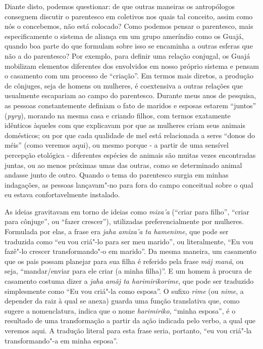 Diante disto, podemos questionar: de que outras maneiras os antropólogos
conseguem discutir o parentesco em coletivos nos quais tal conceito,
assim como nós o concebemos, não está colocado? Como podemos pensar o
parentesco, mais especificamente o sistema de aliança em um grupo
ameríndio como os Guajá, quando boa parte do que formulam sobre isso se
encaminha a outras esferas que não a do parentesco? Por exemplo, para
definir uma relação conjugal, os Guajá mobilizam elementos diferentes
dos envolvidos em nosso próprio sistema e pensam o casamento com um
processo de ``criação''. Em termos mais diretos, a produção de cônjuges,
seja de homens ou mulheres, é coextensiva a outras relações que
usualmente escapariam ao campo do parentesco. Durante meus anos de
pesquisa, as pessoas constantemente definiam o fato de maridos e esposas
estarem ``juntos'' (\emph{pyry}), morando na mesma casa e criando filhos,
com termos exatamente idênticos àqueles com que explicavam por que as
mulheres criam seus animais domésticos; ou por que cada qualidade de mel
está relacionada a seres ``donos do méis'' (como veremos aqui), ou mesmo
porque - a partir de uma sensível percepção etológica - diferentes
espécies de animais são muitas vezes encontradas juntas, ou ao menos
próximas umas das outras, como se determinado animal andasse junto de
outro. Quando o tema do parentesco surgia em minhas indagações, as
pessoas lançavam"-no para fora do campo conceitual sobre o qual eu estava
confortavelmente instalado.

As ideias gravitavam em torno de ideias como \emph{mixa'a} (``criar para
filho'', ``criar para cônjuge'', ou ``fazer crescer''), utilizadas
preferencialmente por mulheres. Formulada por elas, a frase era
\emph{jaha amixa'a ta hamenime}, que pode ser traduzida como ``eu vou
criá"-lo para ser meu marido'', ou literalmente, ``Eu vou fazê"-lo crescer
transformando"-o em marido''. Da mesma maneira, um casamento que os pais
possam planejar para sua filha é referido pela frase \emph{mãj manã}, ou
seja, ``mandar/enviar para ele criar (a minha filha)''. E um homem à
procura de casamento costuma dizer a \emph{jaha amãj ta harimirikorime},
que pode ser traduzido simplesmente como ``Eu vou criá"-la como esposa''. O
sufixo \emph{rime} (ou \emph{nime}, a depender da raiz à qual se anexa)
guarda uma função translativa que, como sugere a nomenclatura, indica
que o nome \emph{harimiriko}, ``minha esposa'', é o resultado de uma
transformação a partir da ação indicada pelo verbo, a qual que veremos
aqui. A tradução literal para esta frase seria, portanto, ``eu vou
criá"-la transformando"-a em minha esposa''.

